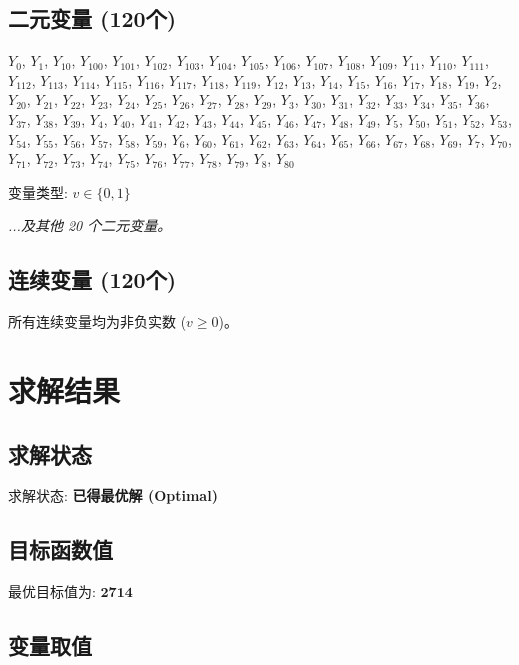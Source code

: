 \documentclass[a4paper,10pt]{article}
\begin{document}
\subsection{二元变量 (120个)}

{\small $Y_{0}$, $Y_{1}$, $Y_{10}$, $Y_{100}$, $Y_{101}$, $Y_{102}$, $Y_{103}$, $Y_{104}$, $Y_{105}$, $Y_{106}$, $Y_{107}$, $Y_{108}$, $Y_{109}$, $Y_{11}$, $Y_{110}$, $Y_{111}$, $Y_{112}$, $Y_{113}$, $Y_{114}$, $Y_{115}$, $Y_{116}$, $Y_{117}$, $Y_{118}$, $Y_{119}$, $Y_{12}$, $Y_{13}$, $Y_{14}$, $Y_{15}$, $Y_{16}$, $Y_{17}$, $Y_{18}$, $Y_{19}$, $Y_{2}$, $Y_{20}$, $Y_{21}$, $Y_{22}$, $Y_{23}$, $Y_{24}$, $Y_{25}$, $Y_{26}$, $Y_{27}$, $Y_{28}$, $Y_{29}$, $Y_{3}$, $Y_{30}$, $Y_{31}$, $Y_{32}$, $Y_{33}$, $Y_{34}$, $Y_{35}$, $Y_{36}$, $Y_{37}$, $Y_{38}$, $Y_{39}$, $Y_{4}$, $Y_{40}$, $Y_{41}$, $Y_{42}$, $Y_{43}$, $Y_{44}$, $Y_{45}$, $Y_{46}$, $Y_{47}$, $Y_{48}$, $Y_{49}$, $Y_{5}$, $Y_{50}$, $Y_{51}$, $Y_{52}$, $Y_{53}$, $Y_{54}$, $Y_{55}$, $Y_{56}$, $Y_{57}$, $Y_{58}$, $Y_{59}$, $Y_{6}$, $Y_{60}$, $Y_{61}$, $Y_{62}$, $Y_{63}$, $Y_{64}$, $Y_{65}$, $Y_{66}$, $Y_{67}$, $Y_{68}$, $Y_{69}$, $Y_{7}$, $Y_{70}$, $Y_{71}$, $Y_{72}$, $Y_{73}$, $Y_{74}$, $Y_{75}$, $Y_{76}$, $Y_{77}$, $Y_{78}$, $Y_{79}$, $Y_{8}$, $Y_{80}$}

变量类型: $v \in \{0,1\}$

\textit{...及其他 20 个二元变量。}

\subsection{连续变量 (120个)}

所有连续变量均为非负实数 ($v \geq 0$)。

\section{求解结果}

\subsection{求解状态}

求解状态: \textbf{已得最优解 (Optimal)}

\subsection{目标函数值}

最优目标值为: $\mathbf{2714}$

\subsection{变量取值}
\end{document}
